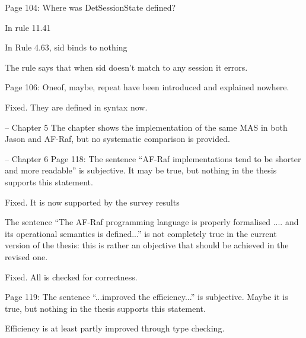 \documentclass{article}
\newcommand{\todo}[1]{[\textcolor{green}{TODO}: #1]}
\newenvironment{them}{\noindent\begingroup\color{blue}}{\endgroup\par}
\begin{document}
\begin{them}

Page 104:
Where was DetSessionState defined?
\end{them}
In rule 11.41

\begin{them}

In Rule 4.63, sid binds to nothing
\end{them}
The rule says that when sid doesn't match to any session it errors.

\begin{them}

Page 106:
Oneof, maybe, repeat have been introduced and explained nowhere.
\end{them}
Fixed. They are defined in syntax now.

\begin{them}

-- Chapter 5
The chapter shows the implementation of the same MAS in both Jason and AF-Raf,
but no systematic comparison is provided.

\end{them}
\todo{}

\begin{them}

-- Chapter 6
Page 118:
The sentence “AF-Raf implementations tend to be shorter and more readable” is
subjective. It may be true, but nothing in the thesis supports this statement.

\end{them}
Fixed. It is now supported by the survey results

\begin{them}

The sentence “The AF-Raf programming language is properly formalised .... and
its operational semantics is defined...” is not completely true in the current
version of the thesis: this is rather an objective that should be achieved in
the revised one.

\end{them}
Fixed. All is checked for correctness.

\begin{them}

Page 119:
The sentence “...improved the efficiency...” is subjective. Maybe it is true,
but nothing in the thesis supports this statement.

\end{them}
Efficiency is at least partly improved through type checking.
\end{document}
